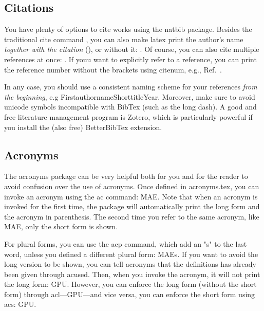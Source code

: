     \subsection{Citations}
        \label{subsec:citations}
    You have plenty of options to cite works using the natbib package.
    Besides the traditional cite command \cite{andersonMore1972}, you can also make latex print the author's name \textit{together with the citation} (\citet{andersonMore1972}), or without it: \citeauthor{andersonMore1972}.
    Of course, you can also cite multiple references at once: \cite{bornZur1927,giannozziQUANTUM2009,giannozziQuantum2020}.
    If youu want to explicitly refer to a reference, you can print the reference number without the brackets using citenum, e.g., Ref.~.

    In any case, you should use a consistent naming scheme for your references \textit{from the beginning}, e.g FirstauthornameShorttitleYear.
    Moreover, make sure to avoid unicode symbols incompatible with BibTex (such as the long dash).
    A good and free literature management program is Zotero, which is particularly powerful if you install the (also free) BetterBibTex extension.
    \subsection{Acronyms}
        \label{subsec:acronyms}
    The acronyms package can be very helpful both for you and for the reader to avoid confusion over the use of acronyms.
    Once defined in acronyms.tex, you can invoke an acronym using the ac command: \ac{MAE}.
    Note that when an acronym is invoked for the first time, the package will automatically print the long form and the acronym in parenthesis.
    The second time you refer to the same acronym, like \ac{MAE}, only the short form is shown.

    For plural forms, you can use the acp command, which add an "s" to the last word, unless you defined a different plural form: \acp{MAE}.
    If you want to avoid the long version to be shown, you can tell acronyms that the definitions has already been given through acused.
    Then, when you invoke the acronym, it will not print the long form: \ac{GPU}.
    However, you can enforce the long form (without the short form) through acl---\acl{GPU}---and vice versa, you can enforce the short form using acs: \acs{GPU}.
